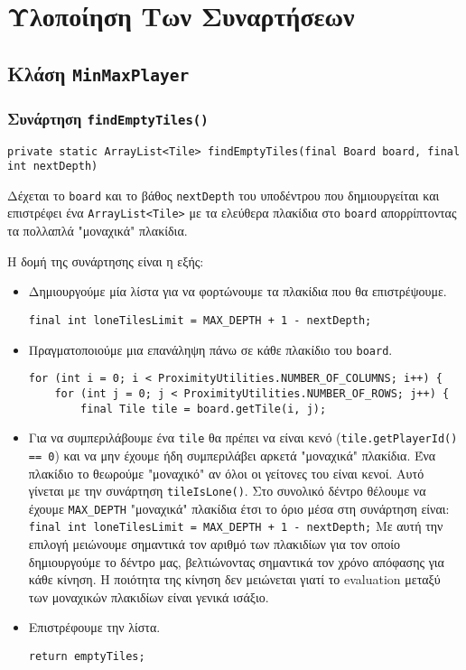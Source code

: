 \chapter{Υλοποίηση Των Συναρτήσεων}
\section{Κλάση \texttt{MinMaxPlayer}}
\subsection{Συνάρτηση \texttt{findEmptyTiles()}}\label{fun:findEmptyTiles}
\begin{lstlisting}[title={Declaration της συνάρτησης}]
private static ArrayList<Tile> findEmptyTiles(final Board board, final int nextDepth)
\end{lstlisting}
Δέχεται το \lstinline!board! και το βάθος \lstinline!nextDepth! του υποδέντρου που δημιουργείται και επιστρέφει ένα
\lstinline!ArrayList<Tile>! με τα ελεύθερα πλακίδια στο \lstinline!board! απορρίπτοντας τα πολλαπλά "μοναχικά" πλακίδια.

Η δομή της συνάρτησης είναι η εξής:
\begin{itemize}
\item Δημιουργούμε μία λίστα για να φορτώνουμε τα πλακίδια που θα επιστρέψουμε.
\begin{lstlisting}[style=chunk]
final int loneTilesLimit = MAX_DEPTH + 1 - nextDepth;
\end{lstlisting}

\item Πραγματοποιούμε μια επανάληψη πάνω σε κάθε πλακίδιο του \lstinline!board!.
\begin{lstlisting}[style=chunk]
for (int i = 0; i < ProximityUtilities.NUMBER_OF_COLUMNS; i++) {
    for (int j = 0; j < ProximityUtilities.NUMBER_OF_ROWS; j++) {
        final Tile tile = board.getTile(i, j);
\end{lstlisting}

\item Για να συμπεριλάβουμε ένα \lstinline!tile! θα πρέπει να είναι κενό
(\lstinline!tile.getPlayerId() == 0!)
και να μην έχουμε ήδη συμπεριλάβει αρκετά "μοναχικά" πλακίδια.
Ένα πλακίδιο το θεωρούμε "μοναχικό" αν όλοι οι γείτονες του είναι κενοί.
Αυτό γίνεται με την συνάρτηση \lstinline!tileIsLone()!.
Στο συνολικό δέντρο θέλουμε να έχουμε \lstinline!MAX_DEPTH! "μοναχικά" πλακίδια έτσι το όριο μέσα στη συνάρτηση είναι:
\lstinline!final int loneTilesLimit = MAX_DEPTH + 1 - nextDepth;!
Με αυτή την επιλογή μειώνουμε σημαντικά τον αριθμό των πλακιδίων για τον οποίο δημιουργούμε το δέντρο μας,
βελτιώνοντας σημαντικά τον χρόνο απόφασης για κάθε κίνηση.
Η ποιότητα της κίνηση δεν μειώνεται γιατί το evaluation μεταξύ των μοναχικών πλακιδίων είναι γενικά ισάξιο.

\item Επιστρέφουμε την λίστα.
\begin{lstlisting}[style=chunk]
return emptyTiles;
\end{lstlisting}
\end{itemize}

